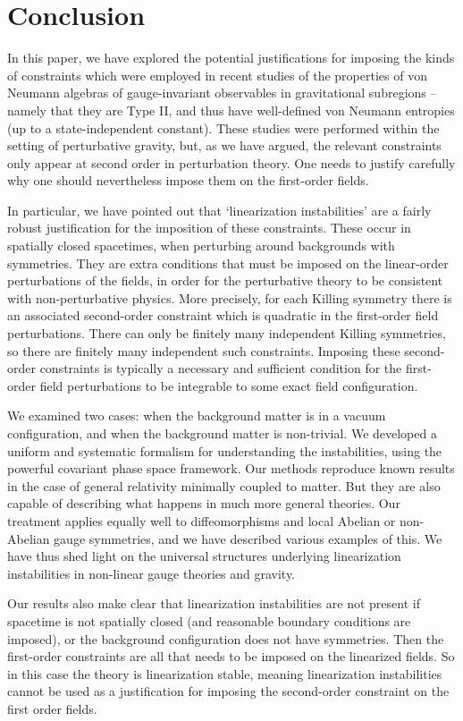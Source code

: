 \documentclass[]{jkpaper}
\theoremstyle{plain}
\theoremstyle{definition}
\begin{document}
\section{Conclusion}\label{sec_conc}

In this paper, we have explored the potential justifications for imposing the kinds of constraints which were employed in recent studies of the properties of von Neumann algebras of gauge-invariant observables in gravitational subregions -- namely that they are Type II, and thus have well-defined von Neumann entropies (up to a state-independent constant). These studies were performed within the setting of perturbative gravity, but, as we have argued, the relevant constraints only appear at second order in perturbation theory. One needs to justify carefully why one should nevertheless impose them on the first-order fields.

In particular, we have pointed out that `linearization instabilities' are a fairly robust justification for the imposition of these constraints. These occur in spatially closed spacetimes, when perturbing around backgrounds with symmetries. They are extra conditions that must be imposed on the linear-order perturbations of the fields, in order for the perturbative theory to be consistent with non-perturbative physics. More precisely, for each Killing symmetry there is an associated second-order constraint which is quadratic in the first-order field perturbations. There can only be finitely many independent Killing symmetries, so there are finitely many independent such constraints. Imposing these second-order constraints is typically a necessary and sufficient condition for the first-order field perturbations to be integrable to some exact field configuration.

We examined two cases: when the background matter is in a vacuum configuration, and when the background matter is non-trivial. We developed a uniform and systematic formalism for understanding the instabilities, using the powerful covariant phase space framework. Our methods reproduce known results in the case of general relativity minimally coupled to matter. But they are also capable of describing what happens in much more general theories. Our treatment applies equally well to diffeomorphisms and local Abelian or non-Abelian gauge symmetries, and we have described various examples of this. We have thus shed light on the universal structures underlying linearization instabilities in non-linear gauge theories and gravity.

Our results also make clear that linearization instabilities are not present if spacetime is not spatially closed (and reasonable boundary conditions are imposed), or the background configuration does not have symmetries. Then the first-order constraints are all that needs to be imposed on the linearized fields. So in this case the theory is linearization stable, meaning linearization instabilities cannot be used as a justification for imposing the second-order constraint on the first order fields. 
\end{document}
